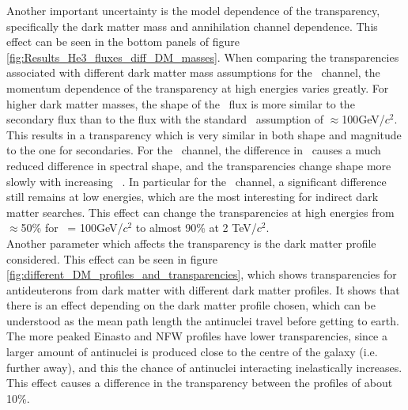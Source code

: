 Another important uncertainty is the model dependence of the transparency, specifically the dark matter mass and annihilation channel dependence. This effect can be seen in the bottom panels of figure \ref{fig:Results_He3_fluxes_diff_DM_masses}. When comparing the transparencies associated with different dark matter mass assumptions for the \WW\ channel, the momentum dependence of the transparency at high energies varies greatly. For higher dark matter masses, the shape of the \ahe\ flux is more similar to the secondary flux than to the flux with the standard \dmm\ assumption of $\approx$100GeV/$c^2$. This results in a transparency which is very similar in both shape and magnitude to the one for secondaries. For the \bb\ channel, the difference in \dmm\ causes a much reduced difference in spectral shape, and the transparencies change shape more slowly with increasing \dmm\ . In particular for the \bb\ channel, a significant difference still remains at low energies, which are the most interesting for indirect dark matter searches. This effect can change the transparencies at high energies from $\approx$50\% for \dmm\ = 100GeV/$c^2$ to almost 90\% at 2 TeV/$c^2$. \\
Another parameter which affects the transparency is the dark matter profile considered. This effect can be seen in figure \ref{fig:different_DM_profiles_and_transparencies}, which shows transparencies for antideuterons from dark matter with different dark matter profiles. It shows that there is an effect depending on the dark matter profile chosen, which can be understood as the mean path length the antinuclei travel before getting to earth. The more peaked Einasto and NFW profiles have lower transparencies, since a larger amount of antinuclei is produced close to the centre of the galaxy (i.e. further away), and this the chance of antinuclei interacting inelastically increases. This effect causes a difference in the transparency between the profiles of about 10\%. 
